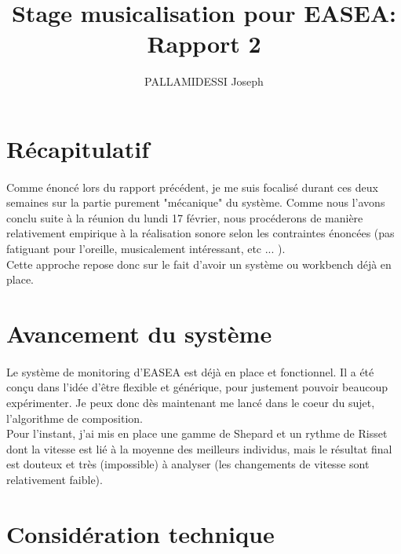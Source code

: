 \documentclass{article}
\begin{document}
  \title{Stage musicalisation pour EASEA: \\
    \large Rapport 2}
  \author{PALLAMIDESSI Joseph}
  \maketitle

  \newpage
  \section{Récapitulatif} %
  \label{sec:Récapitulatif}
    \paragraph{} %
    \label{par:}
    Comme énoncé lors du rapport précédent, je me suis focalisé durant ces deux
    semaines sur la partie purement "mécanique" du système. Comme nous l'avons conclu
    suite à la réunion du lundi 17 février, nous procéderons de manière relativement
    empirique à la réalisation sonore selon les contraintes énoncées (pas fatiguant
    pour l'oreille, musicalement intéressant, etc ... ).\\
    Cette approche repose donc sur le fait d'avoir un système ou workbench déjà en 
    place.
  
  \section{Avancement du système} %
  \label{sec:Avancement du système}
    \paragraph{} %
    \label{par:}
      Le système de monitoring d'EASEA est déjà en place et fonctionnel. Il a été
      conçu dans l'idée d'être flexible et générique, pour justement pouvoir
      beaucoup expérimenter. Je peux donc dès maintenant me lancé dans le
      coeur du sujet, l'algorithme de composition.\\
      Pour l'instant, j'ai mis en place une gamme de Shepard et un rythme de Risset 
      dont la vitesse est lié à la moyenne des meilleurs individus, mais le résultat
      final est douteux et très (impossible) à analyser (les changements de vitesse
      sont relativement faible).

  \section{Considération technique} %
  \label{sec:considération technique}
\end{document}
